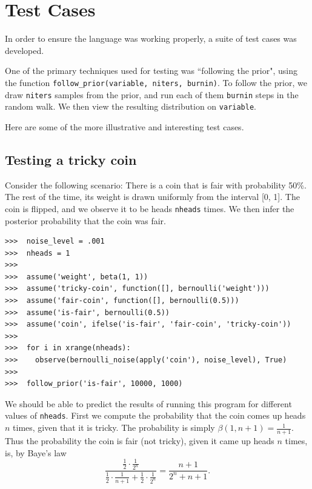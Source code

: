 \documentclass[11pt]{article}
\begin{document}

\pagebreak

\section{Test Cases}

In order to ensure the language was working properly, a suite of test cases was developed.  

One of the primary techniques used for testing was ``following the prior", using the function {\tt follow\_prior(variable, niters, burnin)}.  To follow the prior, we draw {\tt niters} samples from the prior, and run each of them {\tt burnin} steps in the random walk.  We then view the resulting distribution on {\tt variable}.  %

Here are some of the more illustrative and interesting test cases.


\subsection{Testing a tricky coin}

Consider the following scenario:  There is a coin that is fair with probability 50\%.  The rest of the time, its weight is drawn uniformly from the interval [0, 1].  The coin is flipped, and we observe it to be heads {\tt nheads} times.  We then infer the posterior probability that the coin was fair. 

\begin{small}
\begin{verbatim}
>>>  noise_level = .001
>>>  nheads = 1
>>>  
>>>  assume('weight', beta(1, 1))
>>>  assume('tricky-coin', function([], bernoulli('weight')))
>>>  assume('fair-coin', function([], bernoulli(0.5)))
>>>  assume('is-fair', bernoulli(0.5))
>>>  assume('coin', ifelse('is-fair', 'fair-coin', 'tricky-coin')) 
>>>
>>>  for i in xrange(nheads):
>>>    observe(bernoulli_noise(apply('coin'), noise_level), True)
>>>
>>>  follow_prior('is-fair', 10000, 1000)
\end{verbatim}
\end{small}


We should be able to predict the results of running this program for different values of {\tt nheads}.  First we compute the probability that the coin comes up heads $n$ times, given that it is tricky.  The probability is simply $\beta(1, n + 1) = \frac{1}{n +1}$.  Thus the probability the coin is fair (not tricky), given it came up heads $n$ times, is, by Baye's law $$\frac{\frac{1}{2} \cdot \frac{1}{2^n}}{\frac{1}{2} \cdot \frac{1}{n+1} + \frac{1}{2} \cdot \frac{1}{2^n}} = \frac{n+1}{ 2^n + n+1}.$$
\end{document}
